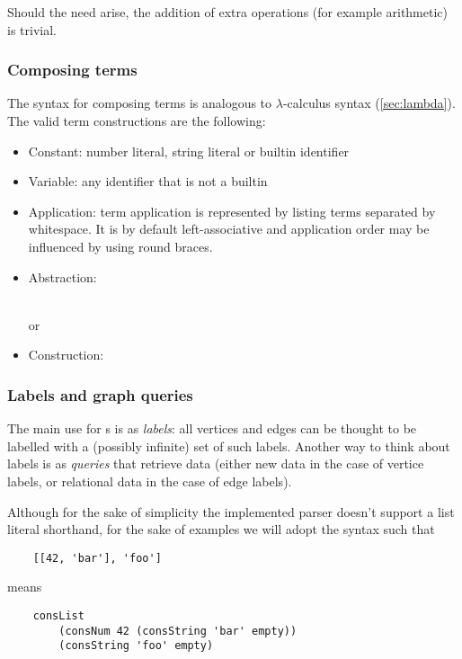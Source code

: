 \documentclass[main.tex]{subfiles}
\begin{document}
Should the need arise, the addition of extra operations (for example arithmetic)
is trivial.

\subsubsection{Composing terms}
The syntax for composing terms is analogous to $\lambda$-calculus syntax
(\cref{sec:lambda}).
The valid term constructions are the following:
\begin{itemize}
    \item Constant: number literal, string literal or builtin identifier
    \item Variable: any identifier that is not a builtin
    \item Application: term application is represented by listing terms
        separated by whitespace. It is by default left-associative and
        application order may be influenced by using round braces.
    \item Abstraction:
        \begin{center}
             \\
            or\\
        \end{center}
    \item Construction:
        \begin{center}
        \end{center}
\end{itemize}

\subsubsection{Labels and graph queries}

The main use for s is as \emph{labels}: all vertices and edges can be thought
to be labelled with a (possibly infinite) set of such labels. Another way
to think about labels is as \emph{queries} that retrieve data (either new
data in the case of vertice labels, or relational data in the case of edge
labels).

Although for the sake of simplicity the implemented parser doesn't support
a list literal shorthand, for the sake of examples we will adopt the syntax
such that
\begin{lstlisting}
    [[42, 'bar'], 'foo']
\end{lstlisting}
means
\begin{lstlisting}
    consList
        (consNum 42 (consString 'bar' empty))
        (consString 'foo' empty)
\end{lstlisting}
\end{document}
